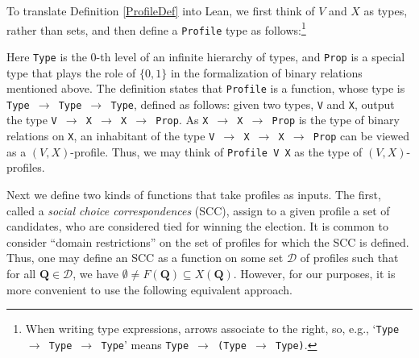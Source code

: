 \documentclass[runningheads]{llncs}
\begin{document}
To translate Definition \ref{ProfileDef} into Lean, we first think of $V$ and $X$ as types, rather than sets, and then define a \texttt{Profile} type as follows:\footnote{When writing type expressions, arrows associate to the right, so, e.g.,  `\texttt{Type $\to$ Type $\to$ Type}' means \texttt{Type $\to$ (Type $\to$ Type)}.}
Here \texttt{Type} is the 0-th level of an infinite hierarchy of types, and \texttt{Prop} is a special type that plays the role of $\{0,1\}$ in the formalization of binary relations mentioned above.  The definition states that \texttt{Profile} is a function, whose type is \texttt{Type $\to$ Type $\to$ Type}, defined as follows: given two types, \texttt{V} and \texttt{X}, output the type  \texttt{V $\to$ X $\to$ X $\to$ Prop}. As \texttt{X $\to$ X $\to$ Prop} is the type of binary relations on \texttt{X}, an inhabitant of the type \texttt{V $\to$ X $\to$ X $\to$ Prop} can be viewed as a $(V,X)$-profile. Thus, we may think of \texttt{Profile V X} as the type of $(V,X)$-profiles.




Next we define two kinds of functions that take profiles as inputs. The first, called a \textit{social choice correspondences} (SCC), assign to a given profile a set of candidates, who are considered tied for winning the election. It is common to consider ``domain restrictions'' on the set of profiles for which the SCC is defined. Thus, one may define an SCC as a function on some set $\mathcal{D}$ of profiles such that for all $\mathbf{Q}\in\mathcal{D}$, we have ${\emptyset\neq F(\mathbf{Q})\subseteq X(\mathbf{Q})}$. However, for our purposes, it is more convenient to use the following equivalent approach.


\end{document}
